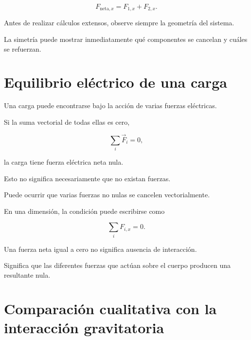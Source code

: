 \[
F_{\text{neta},x}
=
F_{1,x}+F_{2,x}.
\]

\begin{idea}

Antes de realizar cálculos extensos, observe siempre la geometría del
sistema.

La simetría puede mostrar inmediatamente qué componentes se cancelan y cuáles
se refuerzan.

\end{idea}



\section{Equilibrio eléctrico de una carga}

Una carga puede encontrarse bajo la acción de varias fuerzas eléctricas.

Si la suma vectorial de todas ellas es cero,

\[
\boxed{
\sum_i\vec{F}_i=0
},
\]

la carga tiene fuerza eléctrica neta nula.

Esto no significa necesariamente que no existan fuerzas.

Puede ocurrir que varias fuerzas no nulas se cancelen vectorialmente.

En una dimensión, la condición puede escribirse como

\[
\boxed{
\sum_iF_{i,x}=0
}.
\]

\begin{interpretacion}

Una fuerza neta igual a cero no significa ausencia de interacción.

Significa que las diferentes fuerzas que actúan sobre el cuerpo producen una
resultante nula.

\end{interpretacion}



\section{Comparación cualitativa con la interacción gravitatoria}

